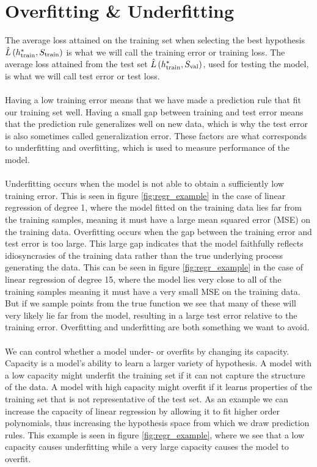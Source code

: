 \section{Overfitting \& Underfitting}
The average loss attained on the training set when selecting the best hypothesis $\hat{L}\left (h^*_\text{train}, S_\text{train}\right)$ is what we will call the training error or training loss. The average loss attained from the test set $\hat{L}\left (h^*_\text{train}, S_\text{val}\right)$, used for testing the model, is what we will call test error or test loss.\\
\\
Having a low training error means that we have made a prediction rule that fit our training set well. Having a small gap between training and test error means that the prediction rule generalizes well on new data, which is why the test error is also sometimes called generalization error. These factors are what corresponds to underfitting and overfitting, which is used to measure performance of the model.\\
\\
Underfitting occurs when the model is not able to obtain a sufficiently low training error. This is seen in figure \ref{fig:regr_example} in the case of linear regression of degree 1, where the model fitted on the training data lies far from the training samples, meaning it must have a large mean squared error (MSE) on the training data. Overfitting occurs when the gap between the training error and test error is too large. This large gap indicates that the model faithfully reflects idiosyncrasies of the training data rather than the true underlying process generating the data. This can be seen in figure \ref{fig:regr_example} in the case of linear regression of degree 15, where the model lies very close to all of the training samples meaning it must have a very small MSE on the training data. But if we sample points from the true function we see that many of these will very likely lie far from the model, resulting in a large test error relative to the training error. Overfitting and underfitting are both something we want to avoid. \\
\\
We can control whether a model under- or overfits by changing its capacity. Capacity is a model's ability to learn a larger variety of hypothesis. A model with a low capacity might underfit the training set if it can not capture the structure of the data. A model with high capacity might overfit if it learns properties of the training set that is not representative of the test set. As an example we can increase the capacity of linear regression by allowing it to fit higher order polynomials, thus increasing the hypothesis space from which we draw prediction rules. This example is seen in figure \ref{fig:regr_example}, where we see that a low capacity causes underfitting while a very large capacity causes the model to overfit.

